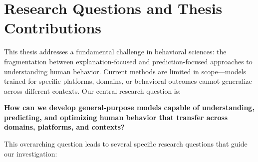 



\section{Research Questions and Thesis Contributions}

This thesis addresses a fundamental challenge in behavioral sciences: the fragmentation between explanation-focused and prediction-focused approaches to understanding human behavior. Current methods are limited in scope—models trained for specific platforms, domains, or behavioral outcomes cannot generalize across different contexts. Our central research question is:

\textbf{How can we develop general-purpose models capable of understanding, predicting, and optimizing human behavior that transfer across domains, platforms, and contexts?}

This overarching question leads to several specific research questions that guide our investigation:

